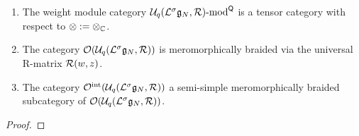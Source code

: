         \begin{definition} \label{def: category_O_loop_QUEs}
            
        \end{definition}
        \begin{lemma} \label{lemma: tensor_structure_and_semi_simplicity_of_category_O}
            \begin{enumerate}
                \item The weight module category $\mathcal{U}_q(\mathcal{L}^{\sigma}\mathfrak{g}_N, \mathcal{R})\text{-}\mathrm{mod}^{\mathsf{Q}}$ is a tensor category with respect to $\tensor := \tensor_{\bbC}$.
                \item The category $\mathcal{O}( \mathcal{U}_q(\mathcal{L}^{\sigma}\mathfrak{g}_N, \mathcal{R}) )$ is meromorphically braided via the universal R-matrix $\mathcal{R}(w, z)$.
                \item The category $\mathcal{O}^{\mathrm{int}}( \mathcal{U}_q(\mathcal{L}^{\sigma}\mathfrak{g}_N, \mathcal{R}) )$ a semi-simple meromorphically braided subcategory of $\mathcal{O}( \mathcal{U}_q(\mathcal{L}^{\sigma}\mathfrak{g}_N, \mathcal{R}) )$.
            \end{enumerate}
        \end{lemma}
            \begin{proof}
                
            \end{proof}

